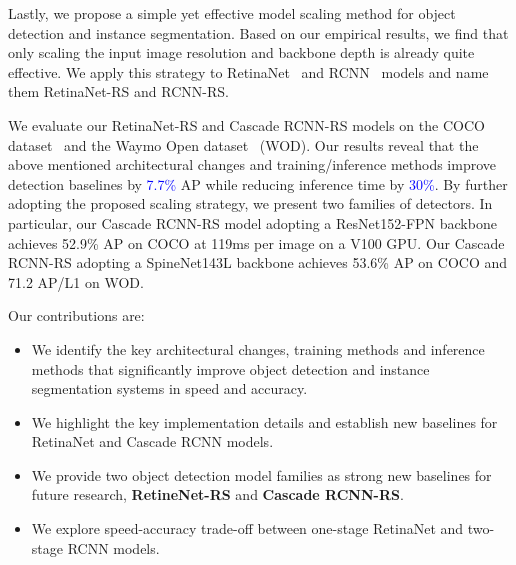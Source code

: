\documentclass[final]{cvpr}
\begin{document}
Lastly, we propose a simple yet effective model scaling method for object detection and instance segmentation. Based on our empirical results, we find that only scaling the input image resolution and backbone depth is already quite effective. We apply this strategy to RetinaNet~\cite{retinanet} and RCNN~\cite{fasterrcnn,mrcnn} models and name them RetinaNet-RS and RCNN-RS.


We evaluate our RetinaNet-RS and Cascade RCNN-RS models on the COCO dataset~\cite{coco} and the Waymo Open dataset~\cite{waymo} (WOD). Our results reveal that the above mentioned architectural changes and training/inference methods improve detection baselines by \textcolor{blue}{7.7\%} AP while reducing inference time by \textcolor{blue}{30\%}.
By further adopting the proposed scaling strategy, we present two families of detectors. In particular, our Cascade RCNN-RS model adopting a ResNet152-FPN backbone achieves 52.9\% AP on COCO at 119ms per image on a V100 GPU. Our Cascade RCNN-RS adopting a SpineNet143L backbone achieves 53.6\% AP on COCO and 71.2 AP/L1 on WOD. 


Our contributions are:

\begin{itemize}
    \item We identify the key architectural changes, training methods and inference methods that significantly improve object detection and instance segmentation systems in speed and accuracy.
    \item We highlight the key implementation details and establish new baselines for RetinaNet and Cascade RCNN models.
    \item We provide two object detection model families as strong new baselines for future research, \textbf{RetineNet-RS} and \textbf{Cascade RCNN-RS}.
    \item We explore speed-accuracy trade-off between one-stage RetinaNet and two-stage RCNN models.
\end{itemize}
\end{document}
